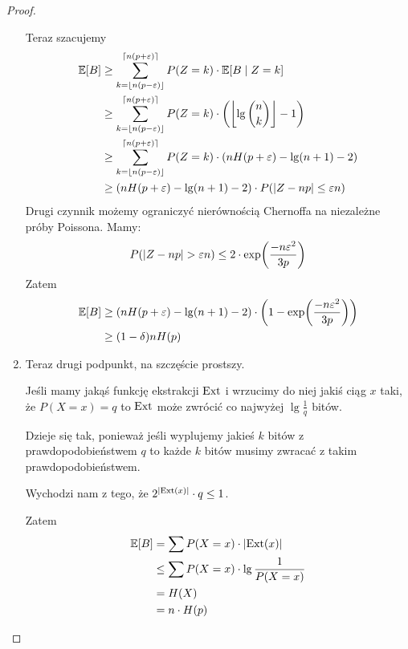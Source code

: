 \begin{proof}
\begin{enumerate}
		      Teraz szacujemy
		      \begin{align*}
			      \expected{B}
			       & \geq \sum_{k=\floor{n(p-\varepsilon)}}^{\ceil{n(p+\varepsilon)}} P(Z = k) \cdot \expected{B \mid Z = k}                  \\
			       & \geq  \sum_{k=\floor{n(p-\varepsilon)}}^{\ceil{n(p+\varepsilon)}} P(Z = k) \cdot \pars{\floor{\lg \binom{n}{k}} - 1}     \\
			       & \geq \sum_{k=\floor{n(p-\varepsilon)}}^{\ceil{n(p+\varepsilon)}} P(Z = k) \cdot \pars{nH(p+\varepsilon) - \lg (n+1) - 2} \\
			       & \geq \pars{nH(p+\varepsilon) - \lg (n+1) - 2} \cdot P\pars{\abs{Z - np} \leq \varepsilon n}
		      \end{align*}
		      Drugi czynnik możemy ograniczyć nierównością Chernoffa na niezależne próby Poissona. Mamy:
		      \[
			      P\pars{\abs{Z - np} > \varepsilon n} \leq 2\cdot \exp\pars{\frac{-n\varepsilon^2}{3p}}
		      \]
		      Zatem
		      \begin{align*}
			      \expected{B}
			       & \geq \pars{nH(p+\varepsilon) - \lg (n+1) - 2}
			      \cdot \pars{1 -\exp\pars{\frac{-n\varepsilon^2}{3p}}} \\
			       & \geq (1 - \delta)n H(p)
		      \end{align*}

		\item Teraz drugi podpunkt, na szczęście prostszy.

		      Jeśli mamy jakąś funkcję ekstrakcji \( \operatorname{Ext} \) i wrzucimy do niej jakiś ciąg \( x \) taki, że
		      \( P(X = x) = q \) to \( \operatorname{Ext} \) może zwrócić co najwyżej \( \lg \frac{1}{q} \) bitów.

		      Dzieje się tak, ponieważ jeśli wyplujemy jakieś \( k \) bitów z prawdopodobieństwem \( q \) to każde \( k \) bitów musimy zwracać z takim prawdopodobieństwem.

		      Wychodzi nam z tego, że \( 2^{\left\lvert\operatorname{Ext}(x)\right\rvert} \cdot q \leq 1 \).

		      Zatem
		      \begin{align*}
			      \expected{B}
			       & = \sum P(X = x) \cdot \abs{\Ext(x)}             \\
			       & \leq \sum P(X = x) \cdot \lg \frac{1}{P(X = x)} \\
			       & = H(X)                                          \\
			       & = n \cdot H(p)
		      \end{align*}
	\end{enumerate}
\end{proof}